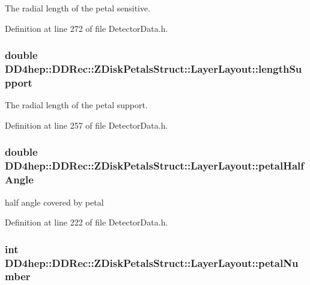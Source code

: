 The radial length of the petal sensitive. 

Definition at line 272 of file DetectorData.h.\hypertarget{struct_d_d4hep_1_1_d_d_rec_1_1_z_disk_petals_struct_1_1_layer_layout_a67fb8540056b8f6523fefa061c7b5aa8}{
\subsubsection[{lengthSupport}]{\setlength{\rightskip}{0pt plus 5cm}double {\bf DD4hep::DDRec::ZDiskPetalsStruct::LayerLayout::lengthSupport}}}
\label{struct_d_d4hep_1_1_d_d_rec_1_1_z_disk_petals_struct_1_1_layer_layout_a67fb8540056b8f6523fefa061c7b5aa8}


The radial length of the petal support. 

Definition at line 257 of file DetectorData.h.\hypertarget{struct_d_d4hep_1_1_d_d_rec_1_1_z_disk_petals_struct_1_1_layer_layout_a85cf828a62962381c4db27d71a536dfa}{
\subsubsection[{petalHalfAngle}]{\setlength{\rightskip}{0pt plus 5cm}double {\bf DD4hep::DDRec::ZDiskPetalsStruct::LayerLayout::petalHalfAngle}}}
\label{struct_d_d4hep_1_1_d_d_rec_1_1_z_disk_petals_struct_1_1_layer_layout_a85cf828a62962381c4db27d71a536dfa}


half angle covered by petal 

Definition at line 222 of file DetectorData.h.\hypertarget{struct_d_d4hep_1_1_d_d_rec_1_1_z_disk_petals_struct_1_1_layer_layout_a4b7640805517bd0d1cb1d2d6aa3ddb99}{
\subsubsection[{petalNumber}]{\setlength{\rightskip}{0pt plus 5cm}int {\bf DD4hep::DDRec::ZDiskPetalsStruct::LayerLayout::petalNumber}}}
\label{struct_d_d4hep_1_1_d_d_rec_1_1_z_disk_petals_struct_1_1_layer_layout_a4b7640805517bd0d1cb1d2d6aa3ddb99}


